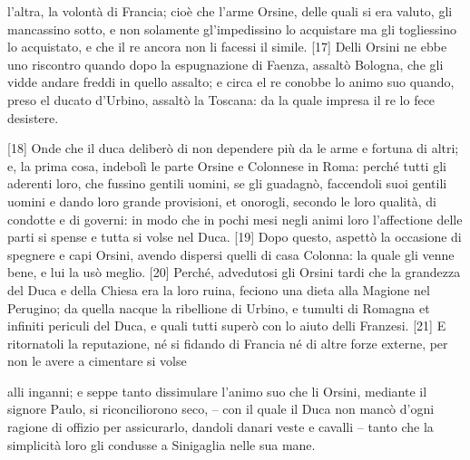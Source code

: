 \quebra

\noindent{}l'altra, la volontà di Francia; cioè che l'arme Orsine, delle quali si
era valuto, gli mancassino sotto, e non solamente gl'impedissino lo
acquistare ma gli togliessino lo acquistato, e che il re ancora non li
facessi il simile. {[}17{]} Delli Orsini ne ebbe uno riscontro quando
dopo la espugnazione di Faenza, assaltò Bologna, che gli vidde andare
freddi in quello assalto; e circa el re conobbe lo animo suo quando,
preso el ducato d'Urbino, assaltò la Toscana: da la quale impresa il re
lo fece desistere.

{[}18{]} Onde che il duca deliberò di non dependere più da le arme e
fortuna di altri; e, la prima cosa, indebolì le parte Orsine e Colonnese
in Roma: perché tutti gli aderenti loro, che fussino gentili uomini, se
gli guadagnò, faccendoli suoi gentili uomini e dando loro grande
provisioni, et onorogli, secondo le loro qualità, di condotte e di
governi: in modo che in pochi mesi negli animi loro l'affectione delle
parti si spense e tutta si volse nel Duca. {[}19{]} Dopo questo, aspettò
la occasione di spegnere e capi Orsini, avendo dispersi quelli di casa
Colonna: la quale gli venne bene, e lui la usò meglio. {[}20{]} Perché,
advedutosi gli Orsini tardi che la grandezza del Duca e della Chiesa era
la loro ruina, feciono una dieta alla Magione nel Perugino; da quella
nacque la ribellione di Urbino, e tumulti di Romagna et infiniti
periculi del Duca, e quali tutti superò con lo aiuto delli Franzesi.
{[}21{]} E ritornatoli la reputazione, né si fidando di Francia né di
altre forze externe, per non le avere a cimentare si volse \linebreak

\quebra

\noindent{} alli inganni;
e seppe tanto dissimulare l'animo suo che li Orsini, mediante il signore
Paulo, si riconciliorono seco, -- con il quale il Duca non mancò d'ogni
ragione di offizio per assicurarlo, dandoli danari veste e cavalli --
tanto che la simplicità loro gli condusse a Sinigaglia nelle sua mane.

